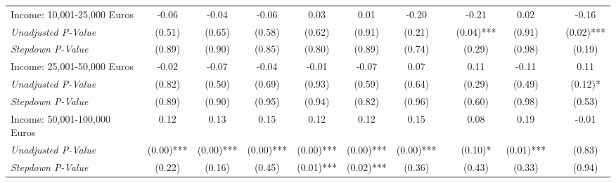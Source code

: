 \begin{tabular}{l c c c c c c c c c c c}
Income: 10,001-25,000 Euros & -0.06 & -0.04 & -0.06 & 0.03 & 0.01 & -0.20 & & -0.21 & 0.02 & & -0.16 \\
\quad \textit{Unadjusted P-Value} & (0.51) & (0.65) & (0.58) & (0.62) & (0.91) & (0.21) & & (0.04)*** & (0.91) & & (0.02)*** \\
\quad \textit{Stepdown P-Value} & (0.89) & (0.90) & (0.85) & (0.80) & (0.89) & (0.74) & & (0.29) & (0.98) & & (0.19) \\
Income: 25,001-50,000 Euros & -0.02 & -0.07 & -0.04 & -0.01 & -0.07 & 0.07 & & 0.11 & -0.11 & & 0.11 \\
\quad \textit{Unadjusted P-Value} & (0.82) & (0.50) & (0.69) & (0.93) & (0.59) & (0.64) & & (0.29) & (0.49) & & (0.12)* \\
\quad \textit{Stepdown P-Value} & (0.89) & (0.90) & (0.95) & (0.94) & (0.82) & (0.96) & & (0.60) & (0.98) & & (0.53) \\
Income: 50,001-100,000 Euros & 0.12 & 0.13 & 0.15 & 0.12 & 0.12 & 0.15 & & 0.08 & 0.19 & & -0.01 \\
\quad \textit{Unadjusted P-Value} & (0.00)*** & (0.00)*** & (0.00)*** & (0.00)*** & (0.00)*** & (0.00)*** & & (0.10)* & (0.01)*** & & (0.83) \\
\quad \textit{Stepdown P-Value} & (0.22) & (0.16) & (0.45) & (0.01)*** & (0.02)*** & (0.36) & & (0.43) & (0.33) & & (0.94) \\
\bottomrule
\end{tabular}
